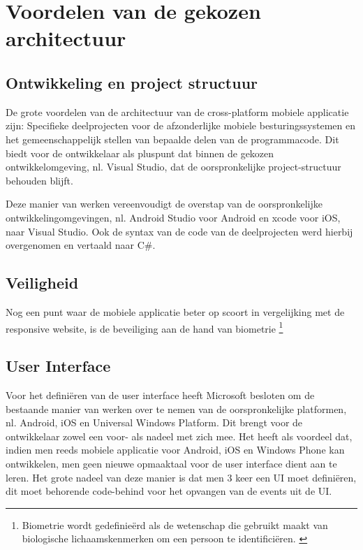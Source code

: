 \label{sec:voordelenvandegekozenapparchitectuur}
\section{Voordelen van de gekozen architectuur}
\subsection{Ontwikkeling en project structuur}
De grote voordelen van de architectuur van de cross-platform mobiele applicatie zijn: Specifieke deelprojecten voor de afzonderlijke
mobiele besturingssystemen en het gemeenschappelijk stellen van bepaalde delen van de programmacode. Dit biedt voor de ontwikkelaar
als pluspunt dat binnen de gekozen ontwikkelomgeving, nl. Visual Studio, dat de oorspronkelijke project-structuur behouden blijft.

Deze manier van werken vereenvoudigt de overstap van de oorspronkelijke ontwikkelingomgevingen, nl. Android Studio voor Android en xcode voor iOS, naar Visual Studio.
Ook de syntax van de code van de deelprojecten werd hierbij overgenomen en vertaald naar C\#.

\subsection{Veiligheid}
Nog een punt waar de mobiele applicatie beter op scoort in vergelijking met de responsive website, is de beveiliging aan de hand van biometrie \footnote{Biometrie wordt gedefinieërd als de wetenschap die gebruikt maakt van biologische lichaamskenmerken om een persoon te identificiëren. \citep{davidcheklingngoandrewbengjinteohjiankunhu2015}}


\subsection{User Interface}
Voor het definiëren van de user interface heeft Microsoft besloten om de bestaande manier van werken over te nemen van de oorspronkelijke platformen, nl. Android, iOS en Universal Windows Platform.
Dit brengt voor de ontwikkelaar zowel een voor- als nadeel met zich mee. Het heeft als voordeel dat, indien men reeds mobiele applicatie voor Android, iOS en Windows Phone kan ontwikkelen, men geen
nieuwe opmaaktaal voor de user interface dient aan te leren. Het grote nadeel van deze manier is dat men 3 keer een UI moet definiëren,
dit moet behorende code-behind voor het opvangen van de events uit de UI.

